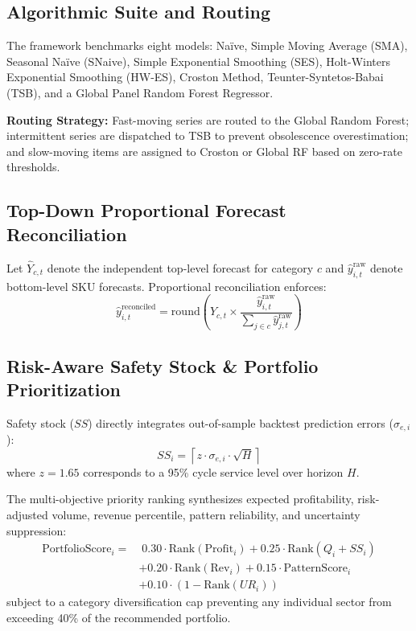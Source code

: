 \documentclass[conference]{IEEEtran}
\begin{document}
\subsection{Algorithmic Suite and Routing}
The framework benchmarks eight models: Naïve, Simple Moving Average (SMA), Seasonal Naïve (SNaive), Simple Exponential Smoothing (SES), Holt-Winters Exponential Smoothing (HW-ES), Croston Method, Teunter-Syntetos-Babai (TSB), and a Global Panel Random Forest Regressor.

\textbf{Routing Strategy:} Fast-moving series are routed to the Global Random Forest; intermittent series are dispatched to TSB to prevent obsolescence overestimation; and slow-moving items are assigned to Croston or Global RF based on zero-rate thresholds.

\subsection{Top-Down Proportional Forecast Reconciliation}
Let $\hat{Y}_{c, t}$ denote the independent top-level forecast for category $c$ and $\hat{y}_{i, t}^{\text{raw}}$ denote bottom-level SKU forecasts. Proportional reconciliation enforces:
\begin{equation}
\hat{y}_{i, t}^{\text{reconciled}} = \text{round} \left( \hat{Y}_{c, t} \times \frac{\hat{y}_{i, t}^{\text{raw}}}{\sum_{j \in c} \hat{y}_{j, t}^{\text{raw}}} \right)
\end{equation}

\subsection{Risk-Aware Safety Stock \& Portfolio Prioritization}
Safety stock ($SS$) directly integrates out-of-sample backtest prediction errors ($\sigma_{e, i}$):
\begin{equation}
SS_i = \left\lceil z \cdot \sigma_{e, i} \cdot \sqrt{H} \right\rceil
\end{equation}
where $z = 1.65$ corresponds to a 95\% cycle service level over horizon $H$.

The multi-objective priority ranking synthesizes expected profitability, risk-adjusted volume, revenue percentile, pattern reliability, and uncertainty suppression:
\begin{align*}
\text{PortfolioScore}_i = & \; 0.30 \cdot \text{Rank}(\text{Profit}_i) + 0.25 \cdot \text{Rank}(Q_i + SS_i) \\
& + 0.20 \cdot \text{Rank}(\text{Rev}_i) + 0.15 \cdot \text{PatternScore}_i \\
& + 0.10 \cdot (1 - \text{Rank}(UR_i))
\end{align*}
subject to a category diversification cap preventing any individual sector from exceeding 40\% of the recommended portfolio.
\end{document}
